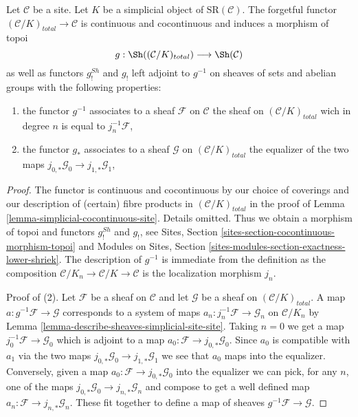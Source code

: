 \begin{lemma}
\label{lemma-comparison}
Let $\mathcal{C}$ be a site. Let $K$ be a simplicial object of
$\text{SR}(\mathcal{C})$. The forgetful functor
$(\mathcal{C}/K)_{total} \to \mathcal{C}$ is continuous and cocontinuous
and induces a morphism of topoi
$$
g : \Sh((\mathcal{C}/K)_{total}) \longrightarrow \Sh(\mathcal{C})
$$
as well as functors $g^{Sh}_!$ and $g_!$ left adjoint to $g^{-1}$
on sheaves of sets and abelian groups with the following properties:
\begin{enumerate}
\item the functor $g^{-1}$ associates to a sheaf $\mathcal{F}$ on
$\mathcal{C}$ the sheaf on $(\mathcal{C}/K)_{total}$ wich in degree $n$
is equal to $j_n^{-1}\mathcal{F}$,
\item the functor $g_*$ associates to a sheaf $\mathcal{G}$ on
$(\mathcal{C}/K)_{total}$ the equalizer of the two maps
$j_{0, *}\mathcal{G}_0 \to j_{1, *}\mathcal{G}_1$,
\end{enumerate}
\end{lemma}

\begin{proof}
The functor is continuous and cocontinuous by our choice of coverings and
our description of (certain) fibre products in $(\mathcal{C}/K)_{total}$
in the proof of Lemma \ref{lemma-simplicial-cocontinuous-site}. Details omitted.
Thus we obtain a morphism of topoi and functors $g^{Sh}_!$ and $g_!$, see
Sites, Section \ref{sites-section-cocontinuous-morphism-topoi} and
Modules on Sites, Section
\ref{sites-modules-section-exactness-lower-shriek}.
The description of $g^{-1}$ is immediate from the definition as the
composition $\mathcal{C}/K_n \to \mathcal{C}/K \to \mathcal{C}$ is
the localization morphism $j_n$.

\medskip\noindent
Proof of (2). Let $\mathcal{F}$ be a sheaf on $\mathcal{C}$ and let
$\mathcal{G}$ be a sheaf on $(\mathcal{C}/K)_{total}$. A map
$a : g^{-1}\mathcal{F} \to \mathcal{G}$ corresponds to a system of maps
$a_n : j_n^{-1}\mathcal{F} \to \mathcal{G}_n$ on $\mathcal{C}/K_n$
by Lemma \ref{lemma-describe-sheaves-simplicial-site-site}.
Taking $n = 0$ we get a map $j_0^{-1}\mathcal{F} \to \mathcal{G}_0$
which is adjoint to a map $a_0 : \mathcal{F} \to j_{0, *}\mathcal{G}_0$.
Since $a_0$ is compatible with $a_1$ via the two maps
$j_{0, *}\mathcal{G}_0 \to j_{1, *}\mathcal{G}_1$ we see that
$a_0$ maps into the equalizer. Conversely, given a map
$a_0 : \mathcal{F} \to j_{0, *}\mathcal{G}_0$ into the equalizer
we can pick, for any $n$, one of the maps
$j_{0, *}\mathcal{G}_0 \to j_{n, *}\mathcal{G}_n$ and compose
to get a well defined map $a_n : \mathcal{F} \to j_{n, *}\mathcal{G}_n$.
These fit together to define a map of sheaves
$g^{-1}\mathcal{F} \to \mathcal{G}$.
\end{proof}

